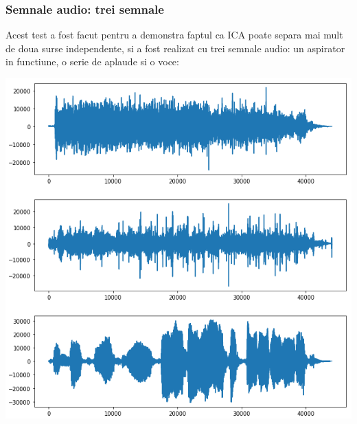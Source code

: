 \documentclass[12pt,oneside]{article}
\begin{document}
 \subsubsection{Semnale audio: trei semnale}
 Acest test a fost facut pentru a demonstra faptul ca ICA poate separa mai mult de doua surse independente, si a fost realizat cu trei semnale audio: un aspirator in functiune, o serie de aplaude si o voce:
\begin{center}
	\includegraphics[scale=1]{three_initial}
 \end{center}
\end{document}
